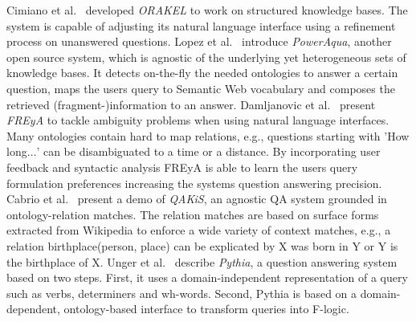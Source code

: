 Cimiano et al.~\cite{orakel} developed \emph{ORAKEL} to work on structured knowledge bases.
The system is capable of adjusting its natural language interface using a refinement process on unanswered questions. 
{Lopez et al.~\cite{poweraqua}} introduce \emph{PowerAqua}, another open source system, which is agnostic of the underlying yet heterogeneous sets of knowledge bases. 
It detects on-the-fly the needed ontologies to answer a certain question, maps the users query to Semantic Web vocabulary and composes the retrieved (fragment-)information to an answer. 
{Damljanovic et al.~\cite{freya}} present \emph{FREyA} to tackle ambiguity problems when using natural language interfaces. 
Many ontologies contain hard to map relations, e.g., questions starting with 'How long$\ldots$' can be disambiguated to a time or a distance. 
By incorporating user feedback and syntactic analysis FREyA is able to learn the users query formulation preferences increasing the systems question answering precision. 
{Cabrio et al.~\cite{qakis}} present a demo of \emph{QAKiS}, an agnostic QA system grounded in ontology-relation matches. 
The relation matches are based on surface forms extracted from Wikipedia to enforce a wide variety of context matches, e.g., a relation birthplace(person, place) can be explicated by X was born in Y or Y is the birthplace of X. 
{Unger et al.~\cite{pythia}} describe \emph{Pythia}, a question answering system based on two steps.
First, it uses a domain-independent representation of a query such as verbs, determiners and wh-words.
Second, Pythia is based on a domain-dependent, ontology-based interface to transform queries into F-logic.

